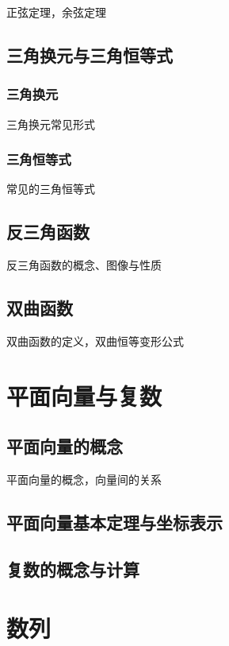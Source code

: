 \documentclass[lang=cn, zihao=4.5]{elegantbook}
\begin{document}
正弦定理，余弦定理

\section{三角换元与三角恒等式}

\subsection{三角换元}

三角换元常见形式

\subsection{三角恒等式}

常见的三角恒等式

\section{反三角函数}

反三角函数的概念、图像与性质

\section{双曲函数}

双曲函数的定义，双曲恒等变形公式

\chapter{平面向量与复数}

\section{平面向量的概念}

平面向量的概念，向量间的关系

\section{平面向量基本定理与坐标表示}

\section{复数的概念与计算}

\chapter{数列}
\end{document}
